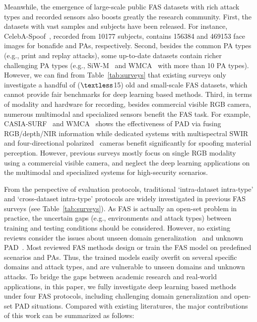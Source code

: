 \documentclass[10pt,journal,compsoc]{IEEEtran}
\begin{document}
Meanwhile, the emergence of large-scale public FAS datasets with rich attack types and recorded sensors also boosts greatly the research community. First, the datasets with vast samples and subjects have been released. For instance, CelebA-Spoof~\cite{zhang2020celeba}, recorded from 10177 subjects, contains 156384 and 469153 face images for bonafide and PAs, respectively. Second, besides the common PA types (e.g., print and replay attacks), some up-to-date datasets contain richer challenging PA types (e.g., SiW-M~\cite{liu2019deep} and WMCA~\cite{george2019biometric} with more than 10 PA types). However, we can find from Table~\ref{tab:surveys} that existing surveys only investigate a handful of ($\textless$15) old and small-scale FAS datasets, which cannot provide fair benchmarks for deep learning based methods. Third, in terms of modality and hardware for recording, besides commercial visible RGB camera, numerous multimodal and specialized sensors benefit the FAS task. For example, CASIA-SURF~\cite{zhang2020casia} and WMCA~\cite{george2019biometric} shows the effectiveness of PAD via fusing RGB/depth/NIR information while dedicated systems with multispectral SWIR~\cite{steiner2016reliable} and four-directional polarized~\cite{tian2020face} cameras benefit significantly for spoofing material perception. However, previous surveys mostly focus on single RGB modality using a commercial visible camera, and neglect the deep learning applications on the multimodal and specialized systems for high-security scenarios.





From the perspective of evaluation protocols, traditional `intra-dataset intra-type' and `cross-dataset intra-type' protocols are widely investigated in previous FAS surveys (see Table~\ref{tab:surveys}). As FAS is actually an open-set problem in practice, the uncertain gaps (e.g., environments and attack types) between training and testing conditions should be considered. However, no existing reviews consider the issues about unseen domain generalization~\cite{shao2019multi,shao2019regularized,wang2020cross,jia2020single} and unknown PAD~\cite{arashloo2017anomaly,liu2019deep,qin2019learning,qin2020one}. Most reviewed FAS methods design or train the FAS model on predefined scenarios and PAs. Thus, the trained models easily overfit on several specific domains and attack types, and are vulnerable to unseen domains and unknown attacks. To bridge the gaps between academic research and real-world applications, in this paper, we fully investigate deep learning based methods under four FAS protocols, including challenging domain generalization and open-set PAD situations. 
Compared with existing literatures, the major contributions of this work can be summarized as follows: 
\end{document}
